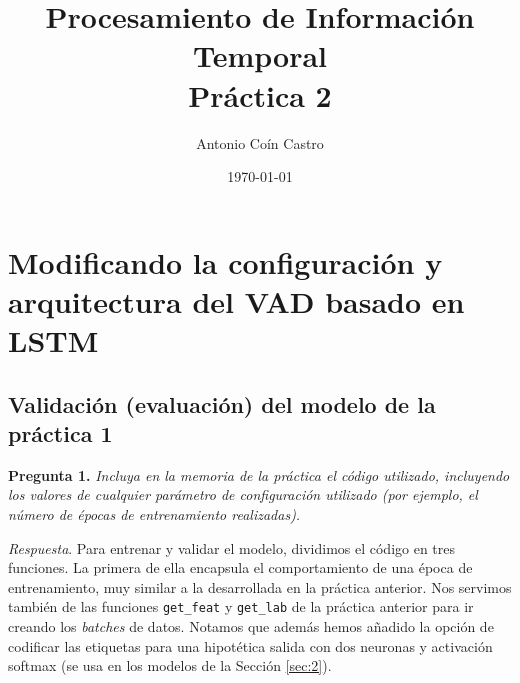 \documentclass[11pt]{article}
\author{Antonio Coín Castro}
\date{\today}
\title{Procesamiento de Información Temporal\\\Large{Práctica 2}}
\begin{document}
\maketitle

\section{Modificando la configuración y arquitectura del VAD basado en LSTM}

\subsection{Validación (evaluación) del modelo de la práctica 1}

\textbf{Pregunta 1.} \textit{Incluya en la memoria de la práctica el código utilizado, incluyendo los valores de cualquier parámetro de configuración utilizado (por ejemplo, el número de épocas de entrenamiento realizadas).}

\textit{Respuesta}. Para entrenar y validar el modelo, dividimos el código en tres funciones. La primera de ella encapsula el comportamiento de una época de entrenamiento, muy similar a la desarrollada en la práctica anterior. Nos servimos también de las funciones \texttt{get\_feat} y \texttt{get\_lab} de la práctica anterior para ir creando los \textit{batches} de datos. Notamos que además hemos añadido la opción de codificar las etiquetas para una hipotética salida con dos neuronas y activación softmax (se usa en los modelos de la Sección \ref{sec:2}).
\end{document}
